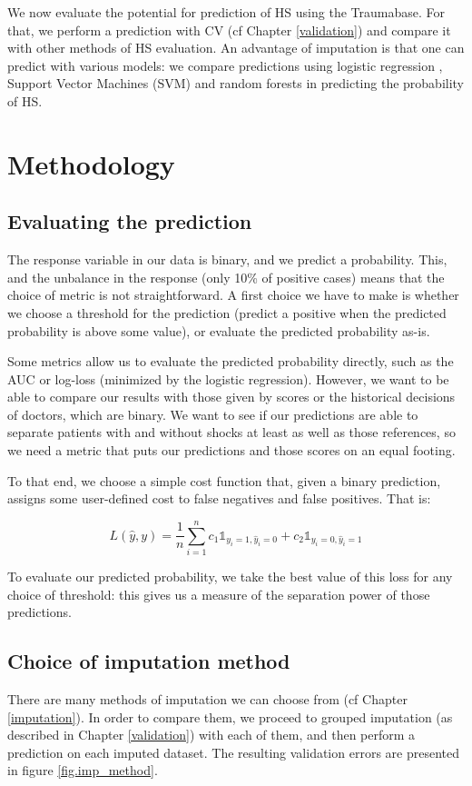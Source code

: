 We now evaluate the potential for prediction of HS using the Traumabase. For that, we perform a prediction with CV (cf Chapter \ref{validation}) and compare it with other methods of HS evaluation. An advantage of imputation is that one can predict with various models: we compare predictions using logistic regression \cite{hosmer2013logreg}, Support Vector Machines (SVM) \cite{hearst1998SVM} and random forests \cite{svetnik2003RF} in predicting the probability of HS.

	\section{Methodology}
		\subsection{Evaluating the prediction}
The response variable in our data is binary, and we predict a probability. This, and the unbalance in the response (only 10\% of positive cases) means that the choice of metric is not straightforward. A first choice we have to make is whether we choose a threshold for the prediction (predict a positive when the predicted probability is above some value), or evaluate the predicted probability as-is.

Some metrics allow us to evaluate the predicted probability directly, such as the AUC \cite{huang2005AUC} or log-loss (minimized by the logistic regression). However, we want to be able to compare our results with those given by scores or the historical decisions of doctors, which are binary. We want to see if our predictions are able to separate patients with and without shocks at least as well as those references, so we need a metric that puts our predictions and those scores on an equal footing.

To that end, we choose a simple cost function that, given a binary prediction, assigns some user-defined cost to false negatives and false positives. That is:

$$ L(\hat{y}, y)=\frac{1}{n} \sum \limits_{i=1}^n c_1 \mathbb{1}_{y_i=1,\hat{y}_i=0} + c_2 \mathbb{1}_{y_i=0,\hat{y}_i=1}$$

To evaluate our predicted probability, we take the best value of this loss for any choice of threshold: this gives us a measure of the separation power of those predictions.

		\subsection{Choice of imputation method}
There are many methods of imputation we can choose from (cf Chapter \ref{imputation}). In order to compare them, we proceed to grouped imputation (as described in Chapter \ref{validation}) with each of them, and then perform a prediction on each imputed dataset. The resulting validation errors are presented in figure \ref{fig.imp_method}.


